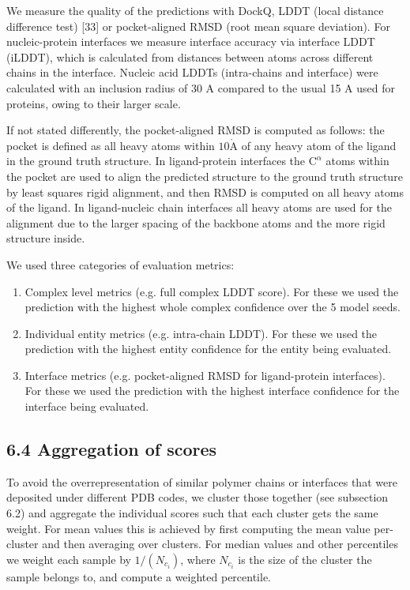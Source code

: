 \documentclass[10pt]{article}
\def\AA{\mathring{\mathrm{A}}}
\begin{document}
We measure the quality of the predictions with DockQ, LDDT (local distance difference test) [33] or pocket-aligned RMSD (root mean square deviation). For nucleic-protein interfaces we measure interface accuracy via interface LDDT (iLDDT), which is calculated from distances between atoms across different chains in the interface. Nucleic acid LDDTs (intra-chains and interface) were calculated with an inclusion radius of 30 A compared to the usual 15 A used for proteins, owing to their larger scale.

If not stated differently, the pocket-aligned RMSD is computed as follows: the pocket is defined as all heavy atoms within $10 \AA$ of any heavy atom of the ligand in the ground truth structure. In ligand-protein interfaces the $\mathrm{C}^{\alpha}$ atoms within the pocket are used to align the predicted structure to the ground truth structure by least squares rigid alignment, and then RMSD is computed on all heavy atoms of the ligand. In ligand-nucleic chain interfaces all heavy atoms are used for the alignment due to the larger spacing of the backbone atoms and the more rigid structure inside.

We used three categories of evaluation metrics:

\begin{enumerate}
  \item Complex level metrics (e.g. full complex LDDT score). For these we used the prediction with the highest whole complex confidence over the 5 model seeds.
  \item Individual entity metrics (e.g. intra-chain LDDT). For these we used the prediction with the highest entity confidence for the entity being evaluated.
  \item Interface metrics (e.g. pocket-aligned RMSD for ligand-protein interfaces). For these we used the prediction with the highest interface confidence for the interface being evaluated.
\end{enumerate}

\subsection*{6.4 Aggregation of scores}
To avoid the overrepresentation of similar polymer chains or interfaces that were deposited under different PDB codes, we cluster those together (see subsection 6.2) and aggregate the individual scores such that each cluster gets the same weight. For mean values this is achieved by first computing the mean value per-cluster and then averaging over clusters. For median values and other percentiles we weight each sample by $1 /\left(N_{c_{i}}\right)$, where $N_{c_{i}}$ is the size of the cluster the sample belongs to, and compute a weighted percentile.
\end{document}
